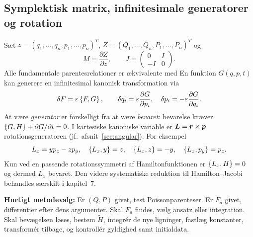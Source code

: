\subsection{Symplektisk matrix, infinitesimale generatorer og rotation}
Sæt $z=(q_1,\dots,q_n,p_1,\dots,p_n)^T$, $Z=(Q_1,\dots,Q_n,P_1,\dots,P_n)^T$ og
\[
M=\frac{\partial Z}{\partial z},\qquad
J=\begin{pmatrix}0&I\\-I&0\end{pmatrix}.
\]
Alle fundamentale parentesrelationer er ækvivalente med
En funktion $G(q,p,t)$ kan generere en infinitesimal kanonisk transformation via
\[
\delta F=\varepsilon\left\{F,G\right\},\qquad
\delta q_i=\varepsilon\frac{\partial G}{\partial p_i},\quad
\delta p_i=-\varepsilon\frac{\partial G}{\partial q_i}.
\]
At være \emph{generator} er forskelligt fra at være \emph{bevaret}: bevarelse kræver $\left\{G,H\right\}+\partial G/\partial t=0$.
I kartesiske kanoniske variable er $\boldsymbol{L}=\boldsymbol{r}\times\boldsymbol{p}$ rotationsgeneratoren (jf.\ afsnit~\ref{sec:angular}). For eksempel
\[
L_x=yp_z-zp_y,\quad
\left\{L_x,y\right\}=z,\quad\left\{L_x,z\right\}=-y,\quad\left\{L_x,p_y\right\}=p_z.
\]
Kun ved en passende rotationssymmetri af Hamiltonfunktionen er $\left\{L_x,H\right\}=0$ og dermed $L_x$ bevaret. Den videre systematiske reduktion til Hamilton--Jacobi behandles særskilt i kapitel~7.

\begin{method}\textbf{Hurtigt metodevalg:} Er $(Q,P)$ givet, test Poissonparenteser. Er $F_a$ givet, differentier efter dens argumenter. Skal $F_a$ findes, vælg ansatz eller integration. Skal bevægelsen løses, bestem $\widetilde H$, integrér de nye ligninger, fastlæg konstanter, transformér tilbage, og kontrollér gyldighed samt initialdata.\end{method}
